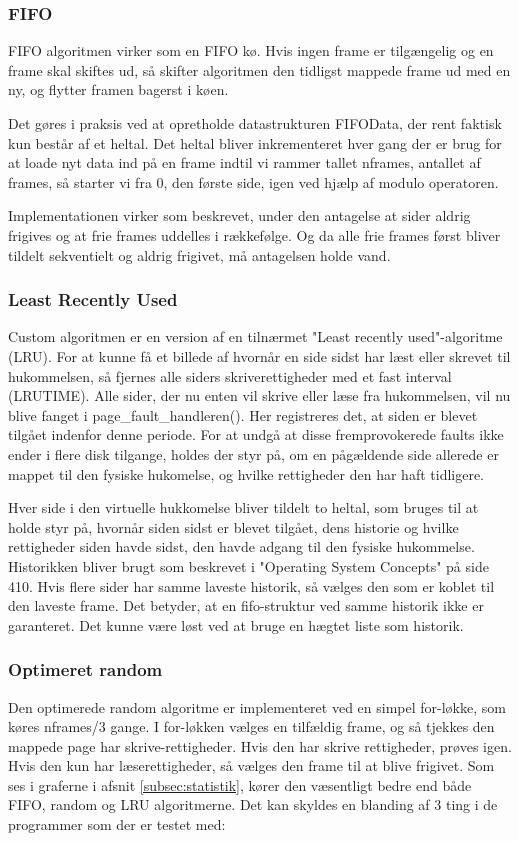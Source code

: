 \subsubsection{FIFO}
FIFO algoritmen virker som en FIFO kø. Hvis ingen frame er tilgængelig og en frame skal skiftes ud, så skifter algoritmen den tidligst mappede frame ud med en ny, og flytter framen bagerst i køen.

Det gøres i praksis ved at opretholde datastrukturen FIFOData, der rent faktisk kun består af et heltal. Det heltal bliver inkrementeret hver gang der er brug for at loade nyt data ind på en frame indtil vi rammer tallet nframes, antallet af frames, så starter vi fra 0, den første side, igen ved hjælp af modulo operatoren.

Implementationen virker som beskrevet, under den antagelse at sider aldrig frigives og at frie frames uddelles i rækkefølge. Og da alle frie frames først bliver tildelt sekventielt og aldrig frigivet, må antagelsen holde vand.


\subsubsection{Least Recently Used}
\label{subsubsec:custom}
Custom algoritmen er en version af en tilnærmet "Least recently used"-algoritme (LRU). For at kunne få et billede af hvornår en side sidst har læst eller skrevet til hukommelsen, så fjernes alle siders skriverettigheder med et fast interval (LRUTIME). Alle sider, der nu enten vil skrive eller læse fra hukommelsen, vil nu blive fanget i page\_fault\_handleren(). Her registreres det, at siden er blevet tilgået indenfor denne periode. For at undgå at disse fremprovokerede faults ikke ender i flere disk tilgange, holdes der styr på, om en pågældende side allerede er mappet til den fysiske hukomelse, og hvilke rettigheder den har haft tidligere.

Hver side i den virtuelle hukkomelse bliver tildelt to heltal, som bruges til at holde styr på, hvornår siden sidst er blevet tilgået, dens historie og hvilke rettigheder siden havde sidst, den havde adgang til den fysiske hukommelse. Historikken bliver brugt som beskrevet i "Operating System Concepts" på side 410. Hvis flere sider har samme laveste historik, så vælges den som er koblet til den laveste frame. Det betyder, at en fifo-struktur ved samme historik ikke er garanteret. Det kunne være løst ved at bruge en hægtet liste som historik.

\subsubsection{Optimeret random}
Den optimerede random algoritme er implementeret ved en simpel for-løkke, som køres nframes/3 gange. I for-løkken vælges en tilfældig frame, og så tjekkes den mappede page har skrive-rettigheder. Hvis den har skrive rettigheder, prøves igen. Hvis den kun har læserettigheder, så vælges den frame til at blive frigivet. 
Som ses i graferne i afsnit \ref{subsec:statistik}, kører den væsentligt bedre end både FIFO, random og LRU algoritmerne. Det kan skyldes en blanding af 3 ting i de programmer som der er testet med: 

